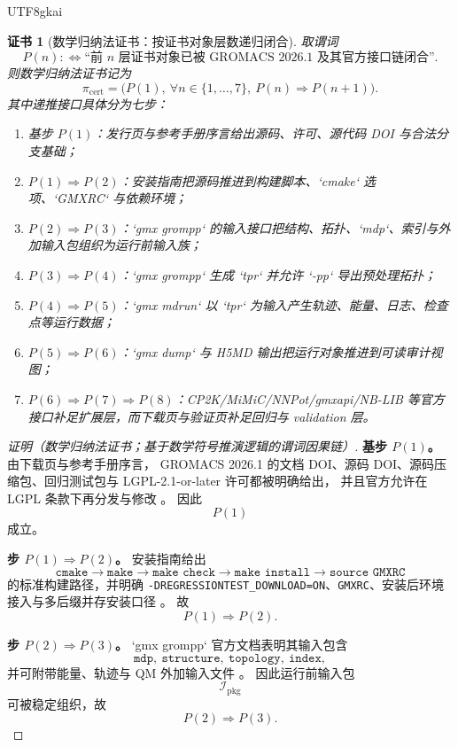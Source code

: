 \documentclass[12pt]{article}
\newtheorem{Certificate}{证书}[section]
\begin{document}
\begin{CJK*}{UTF8}{gkai}
\begin{Certificate}[数学归纳法证书：按证书对象层数递归闭合]
\label{cert:tex39-cert-chain}
取谓词
\[
  P(n)
  :
  \Longleftrightarrow
  \text{“前 }n\text{ 层证书对象已被 GROMACS 2026.1 及其官方接口链闭合”}.
\]
则数学归纳法证书记为
\[
  \pi_{\mathrm{cert}}
  =
  \bigl(
    P(1),\
    \forall n\in\{1,\dots,7\},\ P(n)\Rightarrow P(n+1)
  \bigr).
\]
其中递推接口具体分为七步：
\begin{enumerate}
  \item 基步 $P(1)$：发行页与参考手册序言给出源码、许可、源代码 DOI 与合法分支基础；
  \item $P(1)\Rightarrow P(2)$：安装指南把源码推进到构建脚本、`cmake` 选项、`GMXRC` 与依赖环境；
  \item $P(2)\Rightarrow P(3)$：`gmx grompp` 的输入接口把结构、拓扑、`mdp`、索引与外加输入包组织为运行前输入族；
  \item $P(3)\Rightarrow P(4)$：`gmx grompp` 生成 `tpr` 并允许 `-pp` 导出预处理拓扑；
  \item $P(4)\Rightarrow P(5)$：`gmx mdrun` 以 `tpr` 为输入产生轨迹、能量、日志、检查点等运行数据；
  \item $P(5)\Rightarrow P(6)$：`gmx dump` 与 H5MD 输出把运行对象推进到可读审计视图；
  \item $P(6)\Rightarrow P(7)\Rightarrow P(8)$：CP2K/MiMiC/NNPot/gmxapi/NB-LIB 等官方接口补足扩展层，而下载页与验证页补足回归与 validation 层。
\end{enumerate}
\end{Certificate}

\begin{proof}[证明（数学归纳法证书；基于数学符号推演逻辑的谓词因果链）]
\textbf{基步 $P(1)$。}
由下载页与参考手册序言，
GROMACS 2026.1 的文档 DOI、源码 DOI、源码压缩包、回归测试包与 LGPL-2.1-or-later 许可都被明确给出，
并且官方允许在 LGPL 条款下再分发与修改
\cite{Gromacs2026Downloads,Gromacs2026Preface}。
因此
\[
  P(1)
\]
成立。

\textbf{步 $P(1)\Rightarrow P(2)$。}
安装指南给出
\[
  \texttt{cmake}
  \to
  \texttt{make}
  \to
  \texttt{make check}
  \to
  \texttt{make install}
  \to
  \texttt{source GMXRC}
\]
的标准构建路径，并明确 \texttt{-DREGRESSIONTEST\_DOWNLOAD=ON}、\texttt{GMXRC}、安装后环境接入与多后缀并存安装口径
\cite{Gromacs2026InstallGuide}。
故
\[
  P(1)\Rightarrow P(2).
\]

\textbf{步 $P(2)\Rightarrow P(3)$。}
`gmx grompp` 官方文档表明其输入包含
\[
  \texttt{mdp},\ \texttt{structure},\ \texttt{topology},\ \texttt{index},
\]
并可附带能量、轨迹与 QM 外加输入文件
\cite{Gromacs2026Grompp,Gromacs2026CP2K}。
因此运行前输入包
\[
  \mathcal I_{\mathrm{pkg}}
\]
可被稳定组织，故
\[
  P(2)\Rightarrow P(3).
\]


\end{proof}
\end{CJK*}
\end{document}
